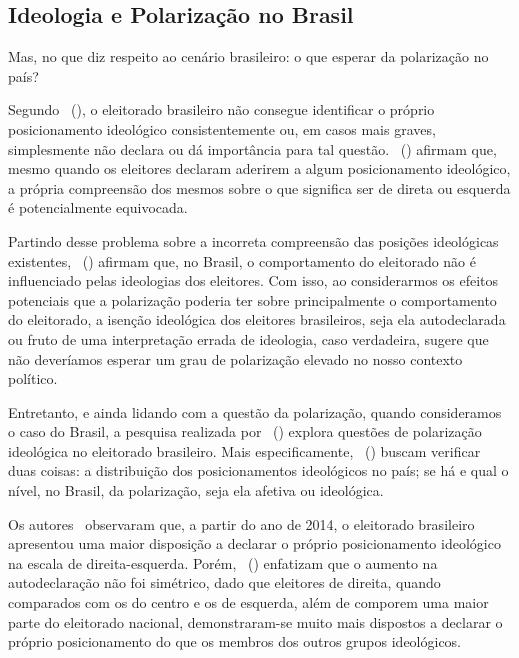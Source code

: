\documentclass[
	12pt,				%
	openright,			%
	twoside,			%
	a4paper,			%
	openany,
	english,			%
	brazil				%
	]{abntex2}
\begin{document}
\subsection{Ideologia e Polarização no Brasil}

Mas, no que diz respeito ao cenário brasileiro: o que esperar da polarização no país?

Segundo ~(\citeyear{Oliveira2015Sep}), o eleitorado brasileiro não consegue identificar o próprio posicionamento ideológico consistentemente ou, em casos mais graves, simplesmente não declara ou dá importância para tal questão. ~(\citeyear{Oliveira2015Sep}) afirmam que, mesmo quando os eleitores declaram aderirem a algum posicionamento ideológico, a própria compreensão dos mesmos sobre o que significa ser de direta ou esquerda é potencialmente equivocada.

Partindo desse problema sobre a incorreta compreensão das posições ideológicas existentes, ~(\citeyear{Oliveira2015Sep}) afirmam que, no Brasil, o comportamento do eleitorado não é influenciado pelas ideologias dos eleitores. Com isso, ao considerarmos os efeitos potenciais que a polarização poderia ter sobre principalmente o comportamento do eleitorado, a isenção ideológica dos eleitores brasileiros, seja ela autodeclarada ou fruto de uma interpretação errada de ideologia, caso verdadeira, sugere que não deveríamos esperar um grau de polarização elevado no nosso contexto político. 

Entretanto, e ainda lidando com a questão da polarização, quando consideramos o caso do Brasil, a pesquisa realizada por ~(\citeyear{fuks2020afeto}) explora questões de polarização ideológica no eleitorado brasileiro. Mais especificamente, ~(\citeyear{fuks2020afeto}) buscam verificar duas coisas: a distribuição dos posicionamentos ideológicos no país; se há e qual o nível, no Brasil, da polarização, seja ela afetiva ou ideológica.

Os autores~\cite{fuks2020afeto} observaram que, a partir do ano de 2014, o eleitorado brasileiro apresentou uma maior disposição a declarar o próprio posicionamento ideológico na escala de direita-esquerda. Porém, ~(\citeyear{fuks2020afeto}) enfatizam que o aumento na autodeclaração não foi simétrico, dado que eleitores de direita, quando comparados com os do centro e os de esquerda, além de comporem uma maior parte do eleitorado nacional, demonstraram-se muito mais dispostos a declarar o próprio posicionamento do que os membros dos outros grupos ideológicos. 
\end{document}
